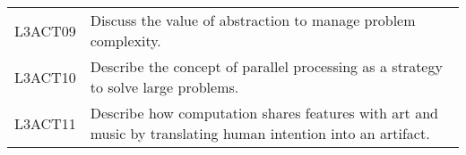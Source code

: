 \begin{longtable}{p{1.8cm}p{11cm}}
 L3ACT09 & Discuss the value of abstraction to manage problem complexity.                                                                                                                                                             \\
 L3ACT10 & Describe the concept of parallel processing as a strategy to solve large problems.                                                                                                                                         \\
 L3ACT11 & Describe how computation shares features with art and music by translating human intention into an artifact.                                                                                                               \\
\end{longtable}                                                                                               
